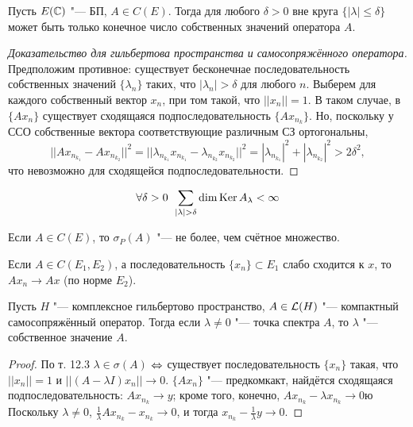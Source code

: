 \documentclass[main]{subfiles}
\begin{document}
\begin{theorem}%
  Пусть \( E(\mathbb{C}) \) "--- БП, \( A \in C(E) \).
  Тогда для любого \( \delta > 0 \) вне круга
  \( \{ |\lambda| \le \delta \} \) может быть
  только конечное число собственных значений оператора \( A \).
\end{theorem}
\begin{proof}[Доказательство для гильбертова пространства и самосопряжённого оператора]
  Предположим противное: существует бесконечнае последовательность
  собственных значений \( \{ \lambda_n \} \)
  таких, что \( |\lambda_n| > \delta \) для любого \( n \).
  Выберем для каждого собственный вектор \( x_n \),
  при том такой, что \( ||x_n|| = 1 \).
  В таком случае, в \( \{ A x_n \} \)
  существует сходящаяся подпоследовательность
  \( \{ A x_{n_k} \} \).
  Но, поскольку у ССО
  собственные вектора соответствующие различным СЗ
  ортогональны,
  \[
    ||A x_{n_{k_1}} - A x_{n_{k_2}}||^2 =
    ||\lambda_{n_{k_1}} x_{n_{k_1}} - \lambda_{n_{k_2}} x_{n_{k_2}}||^2 =
    |\lambda_{n_{k_1}}|^2 + |\lambda_{n_{k_2}}|^2 > 2 \delta^2,
  \]
  что невозможно для сходящейся подпоследовательности.
\end{proof}

\begin{corollary}
  \[
    \forall {\delta > 0} \; \, \sum_{|\lambda| > \delta} \dim \operatorname{Ker} A_\lambda < \infty
  \]
\end{corollary}

\begin{corollary}
  Если \( A \in C(E) \), то \( \sigma_P(A) \) "---
  не более, чем счётное множество.
\end{corollary}

\begin{problem}
  Если \( A \in C(E_1, E_2) \),
  а последовательность \( \{ x_n \} \subset E_1 \)
  слабо сходится к \( x \),
  то \( A x_n \to A x \) (по норме \( E_2 \)).
\end{problem}


\begin{lemma}
  Пусть \( H \) "--- комплексное гильбертово пространство,
  \( A \in \Linears{H} \) "--- компактный самосопряжённый оператор.
  Тогда если \( \lambda \ne 0 \) "--- точка спектра \( A \),
  то \( \lambda \) "--- собственное значение \( A \).
\end{lemma}
\begin{proof}
  По т. 12.3 \( \lambda \in \sigma(A) \) \(\Leftrightarrow\) 
  существует последовательность \( \{ x_n \} \)
  такая, что \( ||x_n|| = 1 \) и
  \( ||(A - \lambda I) x_n|| \to 0 \).
  \( \{ A x_n \} \) "--- предкомкакт,
  найдётся сходящаяся подпоследовательность:
  \( A x_{n_k} \to y \);
  кроме того, конечно,
  \( A x_{n_k} - \lambda x_{n_k} \to 0 \)ю
  Поскольку \( \lambda \ne 0 \),
  \( \frac1\lambda A x_{n_k} - x_{n_k} \to 0 \),
  и тогда \( x_{n_k} - \frac1\lambda y \to 0 \).
\end{proof}
\end{document}
